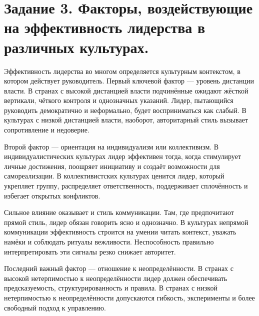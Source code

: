 \documentclass[14pt,a4paper]{extarticle}
\begin{document}
\section{Задание 3. Факторы, воздействующие на эффективность лидерства в различных культурах.}
\begin{sloppypar}
Эффективность лидерства во многом определяется культурным контекстом, в котором
действует руководитель. Первый ключевой фактор — уровень дистанции власти. В
странах с высокой дистанцией власти подчинённые ожидают жёсткой вертикали,
чёткого контроля и однозначных указаний. Лидер, пытающийся руководить
демократично и неформально, будет восприниматься как слабый. В культурах с
низкой дистанцией власти, наоборот, авторитарный стиль вызывает сопротивление и
недоверие.

Второй фактор — ориентация на индивидуализм или коллективизм. В
индивидуалистических культурах лидер эффективен тогда, когда стимулирует личные
достижения, поощряет инициативу и создаёт возможности для самореализации. В
коллективистских культурах ценится лидер, который укрепляет группу,
распределяет ответственность, поддерживает сплочённость и избегает открытых
конфликтов.

Сильное влияние оказывает и стиль коммуникации. Там, где предпочитают прямой
стиль, лидер обязан говорить ясно и однозначно. В культурах непрямой
коммуникации эффективность строится на умении читать контекст, уважать намёки и
соблюдать ритуалы вежливости. Неспособность правильно интерпретировать эти
сигналы резко снижает авторитет.

Последний важный фактор — отношение к неопределённости. В странах с высокой
нетерпимостью к неопределённости лидер должен обеспечивать предсказуемость,
структурированность и правила. В странах с низкой нетерпимостью к
неопределённости допускаются гибкость, эксперименты и более свободный подход к
управлению.
\end{sloppypar}
\end{document}
